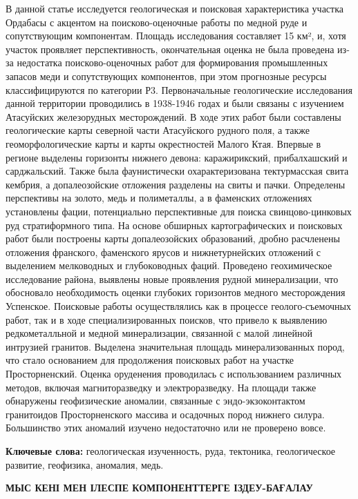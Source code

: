 В данной статье исследуется геологическая и поисковая характеристика
участка Ордабасы с акцентом на поисково-оценочные работы по медной руде
и сопутствующим компонентам. Площадь исследования составляет 15 км², и,
хотя участок проявляет перспективность, окончательная оценка не была
проведена из-за недостатка поисково-оценочных работ для формирования
промышленных запасов меди и сопутствующих компонентов, при этом
прогнозные ресурсы классифицируются по категории Р3. Первоначальные
геологические исследования данной территории проводились в 1938-1946
годах и были связаны с изучением Атасуйских железорудных месторождений.
В ходе этих работ были составлены геологические карты северной части
Атасуйского рудного поля, а также геоморфологические карты и карты
окрестностей Малого Ктая. Впервые в регионе выделены горизонты нижнего
девона: каражирикский, прибалхашский и сарджальский. Также была
фаунистически охарактеризована тектурмасская свита кембрия, а
допалеозойские отложения разделены на свиты и пачки. Определены
перспективы на золото, медь и полиметаллы, а в фаменских отложениях
установлены фации, потенциально перспективные для поиска
свинцово-цинковых руд стратиформного типа. На основе обширных
картографических и поисковых работ были построены карты допалеозойских
образований, дробно расчленены отложения франского, фаменского ярусов и
нижнетурнейских отложений с выделением мелководных и глубоководных
фаций. Проведено геохимическое исследование района, выявлены новые
проявления рудной минерализации, что обосновало необходимость оценки
глубоких горизонтов медного месторождения Успенское. Поисковые работы
осуществлялись как в процессе геолого-съемочных работ, так и в ходе
специализированных поисков, что привело к выявлению редкометалльной и
медной минерализации, связанной с малой линейной интрузией гранитов.
Выделена значительная площадь минерализованных пород, что стало
основанием для продолжения поисковых работ на участке Просторненский.
Оценка оруденения проводилась с использованием различных методов,
включая магниторазведку и электроразведку. На площади также обнаружены
геофизические аномалии, связанные с эндо-экзоконтактом гранитоидов
Просторненского массива и осадочных пород нижнего силура. Большинство
этих аномалий изучено недостаточно или не проверено вовсе.

{\bfseries Ключевые слова:} геологическая изученность, руда, тектоника,
геологическое развитие, геофизика, аномалия, медь.

{\bfseries МЫС КЕНІ МЕН ІЛЕСПЕ КОМПОНЕНТТЕРГЕ ІЗДЕУ-БАҒАЛАУ}

